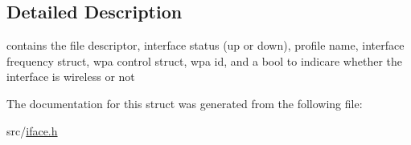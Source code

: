 \subsection{Detailed Description}
contains the file descriptor, interface status (up or down), profile name, interface frequency struct, wpa control struct, wpa id, and a bool to indicare whether the interface is wireless or not 

The documentation for this struct was generated from the following file\+:\begin{DoxyCompactItemize}
\item 
src/\hyperlink{iface_8h}{iface.\+h}\end{DoxyCompactItemize}
